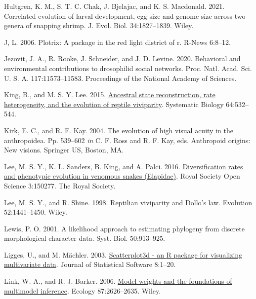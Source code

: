 \documentclass[fleqn,10pt,lineno]{wlpeerj} %
\newlength{\cslhangindent}
\newlength{\cslentryspacingunit} %
\newenvironment{CSLReferences}[2] %
 {%
  \setlength{\parindent}{0pt}
  \ifodd #1
  \let\oldpar\par
  \def\par{\hangindent=\cslhangindent\oldpar}
  \fi
  \setlength{\parskip}{#2\cslentryspacingunit}
 }%
 {}
\begin{document}
\begin{CSLReferences}{1}{0}
\leavevmode{}%
Hultgren, K. M., S. T. C. Chak, J. Bjelajac, and K. S. Macdonald. 2021. Correlated evolution of larval development, egg size and genome size across two genera of snapping shrimp. J. Evol. Biol. 34:1827--1839. Wiley.

\leavevmode{}%
J, L. 2006. Plotrix: A package in the red light district of r. R-News 6:8--12.

\leavevmode{}%
Jezovit, J. A., R. Rooke, J. Schneider, and J. D. Levine. 2020. Behavioral and environmental contributions to drosophilid social networks. Proc. Natl. Acad. Sci. U. S. A. 117:11573--11583. Proceedings of the National Academy of Sciences.

\leavevmode{}%
King, B., and M. S. Y. Lee. 2015. \href{https://doi.org/10.1093/sysbio/syv005}{Ancestral state reconstruction, rate heterogeneity, and the evolution of reptile viviparity}. Systematic Biology 64:532--544.

\leavevmode{}%
Kirk, E. C., and R. F. Kay. 2004. The evolution of high visual acuity in the anthropoidea. Pp. 539--602 \emph{in} C. F. Ross and R. F. Kay, eds. Anthropoid origins: New visions. Springer US, Boston, MA.

\leavevmode{}%
Lee, M. S. Y., K. L. Sanders, B. King, and A. Palci. 2016. \href{https://doi.org/10.1098/rsos.150277}{Diversification rates and phenotypic evolution in venomous snakes ({E}lapidae)}. Royal Society Open Science 3:150277. The Royal Society.

\leavevmode{}%
Lee, M. S. Y., and R. Shine. 1998. \href{https://doi.org/10.1111/j.1558-5646.1998.tb02025.x}{Reptilian viviparity and {D}ollo's law}. Evolution 52:1441--1450. Wiley.

\leavevmode{}%
Lewis, P. O. 2001. A likelihood approach to estimating phylogeny from discrete morphological character data. Syst. Biol. 50:913--925.

\leavevmode{}%
Ligges, U., and M. Mächler. 2003. \href{https://doi.org/10.18637/jss.v008.i11}{Scatterplot3d - an {R} package for visualizing multivariate data}. Journal of Statistical Software 8:1--20.

\leavevmode{}%
Link, W. A., and R. J. Barker. 2006. \href{https://doi.org/10.1890/0012-9658(2006)87\%5B2626:mwatfo\%5D2.0.co;2}{Model weights and the foundations of multimodel inference}. Ecology 87:2626--2635. Wiley.


\end{CSLReferences}
\end{document}
